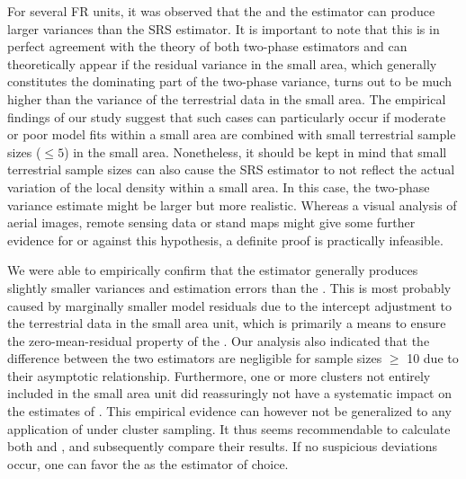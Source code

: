 For several FR units, it was observed that the \psmall{} and the \extpsynth{} estimator can produce larger variances than the SRS estimator. It is important to note that this is in perfect agreement with the theory of both two-phase estimators and can theoretically appear if the residual variance in the small area, which generally constitutes the dominating part of the two-phase variance, turns out to be much higher than the variance of the terrestrial data in the small area. The empirical findings of our study suggest that such cases can particularly occur if moderate or poor model fits within a small area are combined with small terrestrial sample sizes ($\leq 5$) in the small area. Nonetheless, it should be kept in mind that small terrestrial sample sizes can also cause the SRS estimator to not reflect the actual variation of the local density within a small area. In this case, the two-phase variance estimate might be larger but more realistic. Whereas a visual analysis of aerial images, remote sensing data or stand maps might give some further evidence for or against this hypothesis, a definite proof is practically infeasible.\par

We were able to empirically confirm that the \extpsynth{} estimator generally produces slightly smaller variances and estimation errors than the \psmall{}. This is most probably caused by marginally smaller model residuals due to the intercept adjustment to the terrestrial data in the small area unit, which is primarily a means to ensure the zero-mean-residual property of the \extpsynth{}. Our analysis also indicated that the difference between the two estimators are negligible for sample sizes $\geq$ 10 due to their asymptotic relationship. Furthermore, one or more clusters not entirely included in the small area unit did reassuringly not have a systematic impact on the estimates of \extpsynth{}. This empirical evidence can however not be generalized to any application of \extpsynth{} under cluster sampling. It thus seems recommendable to calculate both \psmall{} and \extpsynth{}, and subsequently compare their results. If no suspicious deviations occur, one can favor the \extpsynth{} as the estimator of choice.\par






